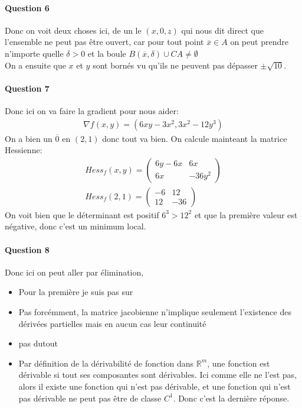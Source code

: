 \documentclass[a4paper]{article}
\begin{document}
\paragraph{Question 6}
Donc on voit deux choses ici, de un le $\left(x, 0, z\right)$ qui nous dit direct que l'ensemble ne peut pas être ouvert, car pour tout point $\overline{x} \in A$ on peut prendre n'importe quelle $\delta > 0$ et la boule  $B\left(\overline{x}, \delta\right) \cup CA \neq \emptyset$\\
On a ensuite que $x$ et $y$ sont bornés vu qu'ils ne peuvent pas dépasser $\pm \sqrt{10}$.
\paragraph{Question 7}
Donc ici on va faire la gradient pour nous aider:
\begin{align*} 
	\nabla f\left(x, y\right) =   \left(6xy - 3x^2, 3x^2 - 12y^3\right)
\end{align*}
On a bien un $\overline{0}$ en $\left(2, 1\right)$ donc tout va bien. On calcule mainteant la matrice Hessienne:
\begin{align*} 
	Hess_f\left(x, y\right) =  \begin{pmatrix}6y -6x  & 6x \\ 6x & -36 y^2 \end{pmatrix}  \\
Hess_f\left(2,1 \right) = \begin{pmatrix} -6 & 12 \\ 12 & -36 \end{pmatrix} 
\end{align*}
On voit bien que le déterminant est positif $6^3 > 12^2$ et que la première valeur est négative, donc c'est un minimum local.
\paragraph{Question 8}
Donc ici on peut aller par élimination, 
\begin{itemize}
	\item Pour la première je suis pas sur
	\item Pas forcémment, la matrice jacobienne n'implique seulement l'existence des dérivées partielles mais en aucun cas leur continuité
	\item pas dutout
	\item Par définition de la dérivabilité de fonction dans $\mathbb{R}^{m}$, une fonction est dérivable si tout ses composantes sont dérivables. Ici comme elle ne l'est pas, alors il existe une fonction qui n'est pas dérivable, et une fonction qui n'est pas dérivable ne peut pas être de classe $C^1$. Donc c'est la dernière réponse.
\end{itemize}
\end{document}
